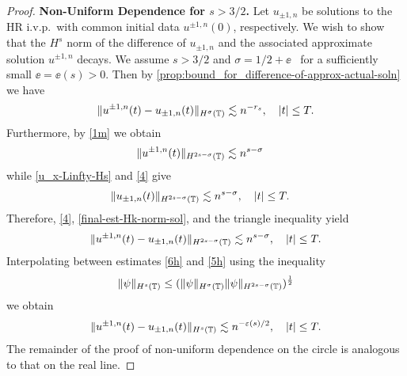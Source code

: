 \begin{proof}
\textbf{Non-Uniform Dependence for $s > 3/2$.}
%
%
%
Let $u_{\pm 1, n}$ be solutions to the HR i.v.p.\ with common initial data 
$u^{\pm 1,
n}(0)$, respectively.
We wish to show that the $H^s$ norm of the difference of $u_{\pm 1,
n}$ and the associated approximate solution $u^{\pm 1, n}$ decays.
We assume
$s > 3/2 $ and $\sigma = 1/2 + \ee$ \ for a sufficiently small
$\ee= \ee(s) > 0$. 
Then by \cref{prop:bound_for_difference-of-approx-actual-soln} we 
have
%
%
\begin{equation}
\begin{split}
\|u^{\pm 1, n}(t) - u_{\pm 1, n} (t) \|_{H^\sigma (\mathbb{T})} \lesssim n^{-r_s}
\label{6h}, \quad |t| \le T.
\end{split}
\end{equation}
%
%
Furthermore, by \eqref{1m} we obtain
%
%
\begin{equation}
\begin{split}
\|u^{\pm 1, n} (t) \|_{H^{2s - \sigma} (\mathbb{T})}
& \lesssim n^{s-\sigma}
\label{4}
\end{split}
\end{equation}
%
%
while \eqref{u_x-Linfty-Hs} and \eqref{4} give
\begin{equation}
\begin{split}
\|u_{\pm 1, n} (t) \|_{H^{2s - \sigma}(\mathbb{T})}
& \lesssim n^{s- \sigma}, \quad |t| \le T.
\label{final-est-Hk-norm-sol}
\end{split}
\end{equation}
%
%
%
%
%
%
%
Therefore, \eqref{4}, \eqref{final-est-Hk-norm-sol}, and the triangle
inequality yield
%
%
\begin{equation}
\begin{split}
\|u^{\pm 1, n} (t) - u_{\pm 1, n}(t)\|_{H^{2s - \sigma}(\mathbb{T})}
\lesssim n^{s-\sigma}, \quad |t| \le T.
\label{5h}
\end{split}
\end{equation}
%
%
%
%
Interpolating between estimates \eqref{6h} and \eqref{5h} using the 
inequality
%
\begin{equation*}
\|\psi \|_{H^s (\mathbb{T})} \leq  (\| \psi \|_{H^\sigma (\mathbb{T})} \| \psi
\|_{H^{2s-\sigma}(\mathbb{T})})^\frac12
\end{equation*}
%
%
we obtain
%
%
\begin{equation}
\begin{split}
\|u^{\pm 1,n}(t) - u_{\pm 1, n}(t) \|_{H^s (\mathbb{T})} \lesssim
n^{-\varepsilon(s)/2}, \quad |t| \le T.
\label{10h}
\end{split}
\end{equation}
%
%
The remainder of the proof of non-uniform dependence on the circle is
analogous to that on the real line. 
\end{proof}
%
%
%
%
%
%
%
%
%
